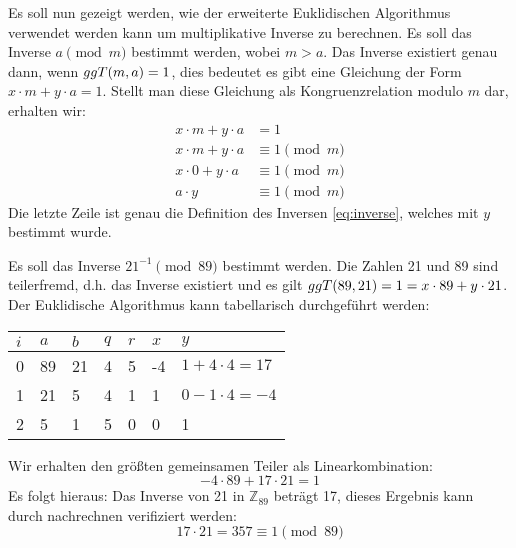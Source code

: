 \noindent
Es soll nun gezeigt werden, wie der erweiterte Euklidischen Algorithmus verwendet werden kann
um multiplikative Inverse zu berechnen. Es soll das Inverse $a \pmod{m}$ bestimmt werden, wobei
$m > a$. Das Inverse existiert genau dann, wenn $ggT(m,a) = 1$, dies bedeutet es gibt
eine Gleichung der Form $x \cdot m + y \cdot a = 1$. Stellt man diese Gleichung
als Kongruenzrelation modulo $m$ dar, erhalten wir:
\begin{align*}
  x \cdot m + y \cdot a & = 1               \\
  x \cdot m + y \cdot a & \equiv 1 \pmod{m} \\
  x \cdot 0 + y \cdot a & \equiv 1 \pmod{m} \\
  a \cdot y             & \equiv 1 \pmod{m}
\end{align*}
Die letzte Zeile ist genau die Definition des Inversen \eqref{eq:inverse}, welches
mit $y$ bestimmt wurde.
\begin{example}
  Es soll das Inverse $21^{-1} \pmod{89}$ bestimmt werden. Die Zahlen 21 und 89 sind
  teilerfremd, d.h. das Inverse existiert und es gilt
  $ggT(89,21) = 1 = x \cdot 89 + y \cdot 21$. Der Euklidische
  Algorithmus kann tabellarisch durchgeführt werden:
  \begin{center}
    \centering
    \begin{tabular}{|l|l|l|l|l|l|l|}
      \hline
      $i$ & $a$ & $b$ & $q$ & $r$ & $x$ & $y$                  \\ \hline
      0   & 89  & 21  & 4   & 5   & -4  & $1 + 4 \cdot 4 = 17$ \\ \hline
      1   & 21  & 5   & 4   & 1   & 1   & $0 - 1 \cdot 4 = -4$ \\ \hline
      2   & 5   & 1   & 5   & 0   & 0   & 1                    \\ \hline
    \end{tabular}
  \end{center}
  \noindent
  Wir erhalten den größten gemeinsamen Teiler als Linearkombination:
  \begin{equation*}
    -4 \cdot 89 + 17 \cdot 21 = 1
  \end{equation*}
  Es folgt hieraus: Das Inverse von 21 in $\mathbb{Z}_{89}$ beträgt 17, dieses Ergebnis kann durch nachrechnen
  verifiziert werden:
  \begin{equation*}
    17 \cdot 21 = 357 \equiv 1 \pmod{89}
  \end{equation*}
\end{example}


